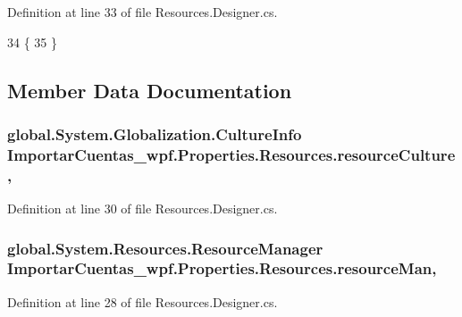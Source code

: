Definition at line 33 of file Resources.\-Designer.\-cs.


\begin{DoxyCode}
34             \{
35             \}
\end{DoxyCode}


\subsection{Member Data Documentation}
\hypertarget{class_importar_cuentas__wpf_1_1_properties_1_1_resources_a117dfc658b85434ab46d186b5bdd82aa}{
\subsubsection[{resource\-Culture}]{\setlength{\rightskip}{0pt plus 5cm}global.\-System.\-Globalization.\-Culture\-Info Importar\-Cuentas\-\_\-wpf.\-Properties.\-Resources.\-resource\-Culture\hspace{0.3cm}{\ttfamily [static]}, {\ttfamily [private]}}}\label{class_importar_cuentas__wpf_1_1_properties_1_1_resources_a117dfc658b85434ab46d186b5bdd82aa}


Definition at line 30 of file Resources.\-Designer.\-cs.

\hypertarget{class_importar_cuentas__wpf_1_1_properties_1_1_resources_a7258a600d86d3acde950551ce6041889}{
\subsubsection[{resource\-Man}]{\setlength{\rightskip}{0pt plus 5cm}global.\-System.\-Resources.\-Resource\-Manager Importar\-Cuentas\-\_\-wpf.\-Properties.\-Resources.\-resource\-Man\hspace{0.3cm}{\ttfamily [static]}, {\ttfamily [private]}}}\label{class_importar_cuentas__wpf_1_1_properties_1_1_resources_a7258a600d86d3acde950551ce6041889}


Definition at line 28 of file Resources.\-Designer.\-cs.



